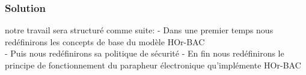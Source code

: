 \documentclass[10pt]{beamer}
\begin{document}
\begin{frame}
 \frametitle{Solution}
  \begin{block}{notre travail sera structuré comme suite: }
    - Dans une premier temps nous redéfinirons les concepts de base du modèle HOr-BAC \\
    - Puis nous redéfinirons sa politique de sécurité
    - En fin nous redéfinirons le principe de fonctionnement du parapheur électronique qu'implémente HOr-BAC
  \end{block}
\end{frame}
 
 \begin{frame}
\end{frame}
\end{document}

